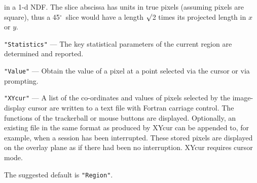 \documentclass[twoside,11pt,nolof]{starlink}
\providecommand{\dgs}{\hbox{$^\circ$}}
\begin{document}
{{{\begin{description}
                          in a 1-d NDF.  The slice abscissa has units in
                          true pixels (assuming pixels are square), thus
                          a 45\dgs\ slice would have a length $\surd$2
                          times its projected length in $x$ or $y$.
         \item \texttt{"Statistics"} --- The key statistical parameters of the current
                          region are determined and reported.
         \item \texttt{"Value"} --- Obtain the value of a pixel at a point selected
                          via the cursor or via prompting.
         \item \texttt{"XYcur"} --- A list of the co-ordinates and values of pixels
                          selected by the image-display cursor are
                          written to a text file with Fortran carriage
                          control. The functions of the trackerball or
                          mouse buttons are displayed.  Optionally, an
                          existing file in the same format as produced
                          by XYcur can be appended to, for example, when
                          a session has been interrupted.  These stored
                          pixels are displayed on the overlay plane as
                          if there had been no interruption.  XYcur
                          requires cursor mode.
         \end{description}
         The suggested default is \texttt{"Region"}.

}}}
\end{document}

